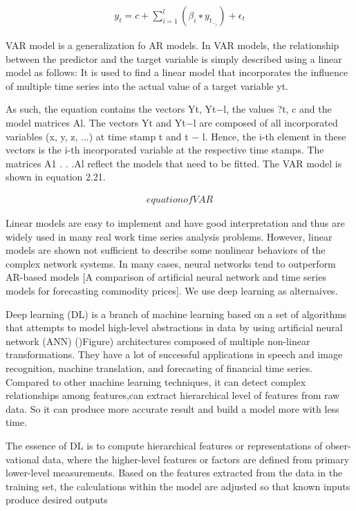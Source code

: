\documentclass[review]{elsarticle}
\begin{document}
\begin{align}
    y_t = c+\sum_{i=1}^{l}(\beta_i ∗ y_t_−_i)+\epsilon_t
\end{align}


VAR model is a generalization fo AR models. In VAR models, the relationship between the predictor and the target variable is simply described using a linear model as follows: It is used to find a linear model that incorporates the influence of multiple time series into the actual value of a target variable yt.

As such, the equation contains the vectors Yt, Yt−l, the values ?t, c and the model matrices Al. The vectors Yt and Yt−l are composed of all incorporated variables (x, y, z, ...) at time stamp t and t − l. Hence, the i-th element in these vectors is the i-th incorporated variable at the respective time stamps. The matrices A1 . . .Al
reflect the models that need to be fitted. The VAR model is shown in equation 2.21.

\begin{align}
    equation of VAR
\end{align}

Linear models are easy to implement and have good interpretation and thus are widely used in many real work time series analysis problems. However, linear models are shown not sufficient to describe some nonlinear behaviors of the complex network systems. In many cases, neural networks tend to outperform AR-based models [A comparison of artificial neural network and time series models for forecasting commodity prices]. We use deep learning as alternaives.

Deep learning (DL) is a branch of machine learning based on a set of algorithms that attempts to model high-level abstractions in data by using artificial neural network (ANN) ()Figure) architectures composed of multiple non-linear transformations. They have a lot of successful applications in speech and image recognition, machine translation, and forecasting of financial time series. Compared to other machine learning techniques, it can detect complex relationships among features,can extract hierarchical level of features from raw data. So it can produce more accurate result and build a model more with less time.

The essence of DL is to compute hierarchical features or representations of obser-vational data, where the higher-level features or factors are defined from primary lower-level measurements. Based on the features extracted from the data in the training set, the calculations within the model are adjusted so that known inputs produce desired outputs
\end{document}
